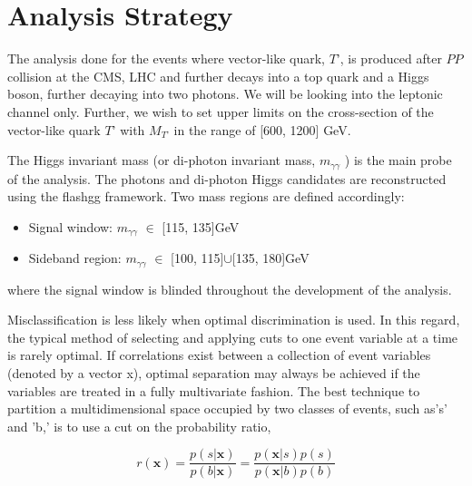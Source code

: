 \chapter{\label{AN}Analysis Strategy}




The analysis done for the events where vector-like quark, $T’$, is produced after $PP$ collision at the CMS, LHC and further decays into a top quark and a Higgs boson, further decaying into two photons. We will be looking into the leptonic channel only. Further, we wish to set upper limits on the cross-section of the vector-like quark $T’$ with $M_{T’}$ in the range of [600, 1200] GeV.

The Higgs invariant mass (or di-photon invariant mass, $m_{\gamma\gamma}$ ) is the main probe of the analysis. The photons and di-photon Higgs candidates are reconstructed using the flashgg framework\cite{CrossSection_6}.
 Two mass regions are defined accordingly:
\begin{itemize}
    \item Signal window:  $m_{\gamma\gamma}$ $\in$ [115, 135]GeV
    \item Sideband region: $m_{\gamma\gamma}$ $\in$ [100, 115]$\cup$[135, 180]GeV
\end{itemize}
where the signal window is blinded throughout the development of the analysis.



Misclassification is less likely when optimal discrimination is used. In this regard, the typical method of selecting and applying cuts to one event variable at a time is rarely optimal. If correlations exist between a collection of event variables (denoted by a vector x), optimal separation may always be achieved if the variables are treated in a fully multivariate fashion. The best technique to partition a multidimensional space occupied by two classes of events, such as's' and 'b,' is to use a cut on the probability ratio,

\begin{equation}
    r(\textbf{x}) = \frac{p(s|\textbf{x})}{p(b|\textbf{x})} = \frac{p(\textbf{x}|s) p(s) }{p(\textbf{x}|b) p(b) }
\end{equation}

